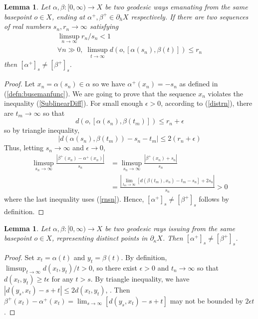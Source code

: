 \documentclass{amsart}
\newtheorem{lem}[thm]{Lemma}
\theoremstyle{definition}
\theoremstyle{remark}
\newcommand{\U}{ X}
\newcommand{\hU}{\partial_h{  X}}
\newcommand{\pka}{\partial_\kappa}
\newcommand{\ywy}[1]{{\color{blue}{#1}}}
\begin{document}
\begin{lem}\label{lineardiverging}
Let $\alpha,\beta:[0,\infty)\to \U$ be two geodesic ways emanating from the same basepoint $o\in \U$, ending at  $\alpha^+,\beta^+\in \hU$ respectively. 
If there are two sequences of real numbers $s_n, r_n\to\infty$ satisfying  
\begin{align}
\label{rnsn} \limsup_{n\to\infty} r_n/s_n<1\\
\label{distrn}\forall n\gg0, \; \limsup_{t\to\infty} d(o, [\alpha(s_n), \beta(t)])\le r_n
\end{align}
then $[\alpha^+]_s\ne [\beta^+]_s$.   
\end{lem}
\begin{proof}
Let $x_n=\alpha(s_n)\in \alpha$ so we have $\alpha^+(x_n)=-s_n$ as defined in (\ref{defn:busemanfunc}). We are going to prove that the sequence $x_n$ violates the inequality (\ref{SublinearDiff}). 
For small enough $\epsilon>0$, according to (\ref{distrn}), there are $t_m\to \infty$ so that $$d(o, [\alpha(s_n), \beta(t_m)])\le r_n+\epsilon$$ so by triangle inequality, $$|d(\alpha(s_n),\beta(t_m))- s_n-t_m|\le 2(r_n+\epsilon)$$ Thus, letting $s_n\to\infty$ and $\epsilon\to 0$, 
$$\begin{aligned}
\limsup_{s_n\to\infty} \frac{|\beta^+(x_n)-\alpha^+(x_n)|}{s_n}&=\limsup_{s_n\to\infty} \frac{|\beta^+(x_n)+s_n|}{s_n}\\
&=\frac{|\lim_{t_m\to\infty} [d(\beta(t_m),x_n)-t_m-s_n] +2s_n|}{s_n} > 0    
\end{aligned}$$
where the last inequality uses (\ref{rnsn}). Hence, $[\alpha^+]_s\ne [\beta^+]_s$ follows by definition.   
\end{proof}
\iffalse
\begin{lem}\label{lineardiverging2}
Let $\alpha,\beta:[0,\infty)\to \U$ be two geodesic rays issuing from the same basepoint $o\in \U$, representing distinct points in $\pka \U$. Then $[\alpha^+]_s\ne [\beta^+]_s$.   
\end{lem}
\begin{proof} \ywy{Proof contains gaps}
Set $x_t=\alpha(t)$ and $y_t=\beta(t)$. By definition, $\limsup_{t\to\infty}d(x_t, y_t)/t>0$, so there exist $\epsilon>0$ and $t_n\to \infty$ so that $d(x_t, y_t)\ge t \epsilon$ for any $t>s$. By triangle inequality, we have $|d(y_s,x_t)-s+t|\le 2d(x_t, y_t)$, \ywy{and $|d(y_s,x_t)-s+t|$ may not be lower bounded by  $2d(x_t, y_t)$ and then by $2\epsilon t$}. Then $\beta^+(x_t)-\alpha^+(x_t)=\lim_{s\to\infty}[d(y_s,x_t)-s+t]$ may not be bounded by $2\epsilon t$.   
\end{proof}
\end{document}
